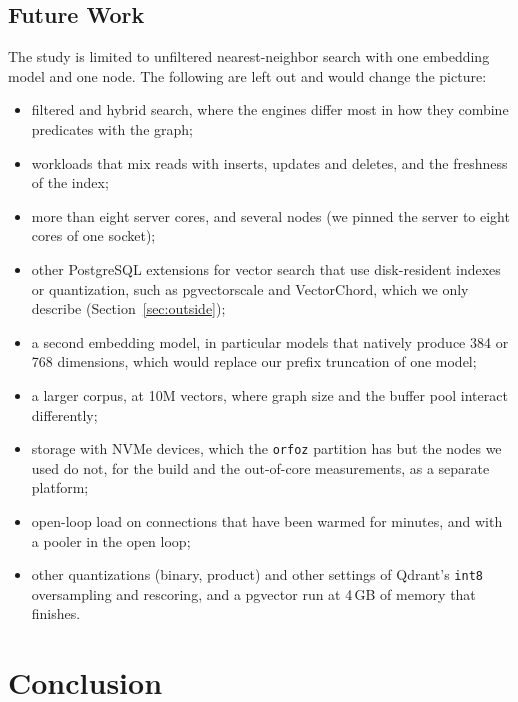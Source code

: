 \documentclass[preprint,12pt]{elsarticle}
\begin{document}
\subsection{Future Work}

The study is limited to unfiltered nearest-neighbor search with one embedding model and one node. The following are left out and would change the picture:
\begin{itemize}
  \item filtered and hybrid search, where the engines differ most in how they combine predicates with the graph;
  \item workloads that mix reads with inserts, updates and deletes, and the freshness of the index;
  \item more than eight server cores, and several nodes (we pinned the server to eight cores of one socket);
  \item other PostgreSQL extensions for vector search that use disk-resident indexes or quantization, such as pgvectorscale and VectorChord, which we only describe (Section~\ref{sec:outside});
  \item a second embedding model, in particular models that natively produce 384 or 768 dimensions, which would replace our prefix truncation of one model;
  \item a larger corpus, at 10M vectors, where graph size and the buffer pool interact differently;
  \item storage with NVMe devices, which the \texttt{orfoz} partition has but the nodes we used do not, for the build and the out-of-core measurements, as a separate platform;
  \item open-loop load on connections that have been warmed for minutes, and with a pooler in the open loop;
  \item other quantizations (binary, product) and other settings of Qdrant's \texttt{int8} oversampling and rescoring, and a pgvector run at 4\,GB of memory that finishes.
\end{itemize}

\section{Conclusion}
\end{document}
